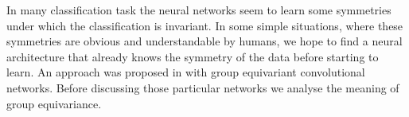 \documentclass[../3.tex]{subfiles}
\begin{document}
    In many classification task the neural networks seem to learn some symmetries under which the classification is invariant.
    In some simple situations, where these symmetries are obvious and understandable by humans, we hope to find a neural architecture
    that already knows the symmetry of the data before starting to learn. An approach was proposed in \cite{gcnn} with group equivariant
    convolutional networks. Before discussing those particular networks we analyse the meaning of group equivariance.
\end{document}
